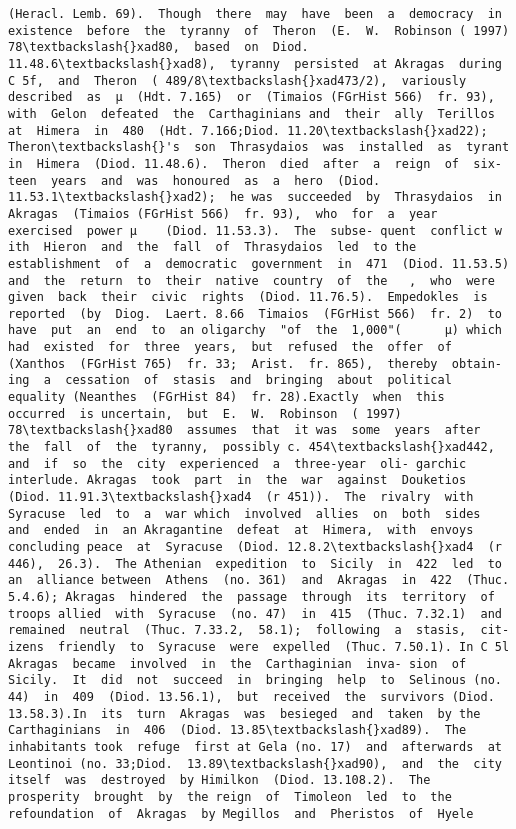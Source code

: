 \documentclass[11pt]{article}
\begin{document}
\begin{Verbatim}[commandchars=\\\{\}]
(Heracl. Lemb. 69).  Though  there  may  have  been  a  democracy  in existence  before  the  tyranny  of  Theron  (E.  W.  Robinson ( 1997)  78\textbackslash{}xad80,  based  on  Diod. 11.48.6\textbackslash{}xad8),  tyranny  persisted  at Akragas  during  C 5f,  and  Theron  ( 489/8\textbackslash{}xad473/2),  variously described  as  µ  (Hdt. 7.165)  or  (Timaios (FGrHist 566)  fr. 93),  with  Gelon  defeated  the  Carthaginians and  their  ally  Terillos  at  Himera  in  480  (Hdt. 7.166;Diod. 11.20\textbackslash{}xad22);  Theron\textbackslash{}'s  son  Thrasydaios  was  installed  as  tyrant in  Himera  (Diod. 11.48.6).  Theron  died  after  a  reign  of  six- teen  years  and  was  honoured  as  a  hero  (Diod. 11.53.1\textbackslash{}xad2);  he was  succeeded  by  Thrasydaios  in  Akragas  (Timaios (FGrHist 566)  fr. 93),  who  for  a  year  exercised  power µ    (Diod. 11.53.3).  The  subse- quent  conflict w ith  Hieron  and  the  fall  of  Thrasydaios  led  to the  establishment  of  a  democratic  government  in  471  (Diod. 11.53.5)  and  the  return  to  their  native  country  of  the   ,  who  were  given  back  their  civic  rights  (Diod. 11.76.5).  Empedokles  is  reported  (by  Diog.  Laert. 8.66  Timaios  (FGrHist 566)  fr. 2)  to  have  put  an  end  to  an oligarchy  "of  the  1,000"(      µ) which had  existed  for  three  years,  but  refused  the  offer  of  (Xanthos  (FGrHist 765)  fr. 33;  Arist.  fr. 865),  thereby  obtain- ing  a  cessation  of  stasis  and  bringing  about  political  equality (Neanthes  (FGrHist 84)  fr. 28).Exactly  when  this  occurred  is uncertain,  but  E.  W.  Robinson  ( 1997)  78\textbackslash{}xad80  assumes  that  it was  some  years  after  the  fall  of  the  tyranny,  possibly c. 454\textbackslash{}xad442,  and  if  so  the  city  experienced  a  three-year  oli- garchic  interlude. Akragas  took  part  in  the  war  against  Douketios  (Diod. 11.91.3\textbackslash{}xad4  (r 451)).  The  rivalry  with  Syracuse  led  to  a  war which  involved  allies  on  both  sides  and  ended  in  an Akragantine  defeat  at  Himera,  with  envoys  concluding peace  at  Syracuse  (Diod. 12.8.2\textbackslash{}xad4  (r 446),  26.3).  The Athenian  expedition  to  Sicily  in  422  led  to  an  alliance between  Athens  (no. 361)  and  Akragas  in  422  (Thuc. 5.4.6); Akragas  hindered  the  passage  through  its  territory  of  troops allied  with  Syracuse  (no. 47)  in  415  (Thuc. 7.32.1)  and remained  neutral  (Thuc. 7.33.2,  58.1);  following  a  stasis,  cit- izens  friendly  to  Syracuse  were  expelled  (Thuc. 7.50.1). In C 5l  Akragas  became  involved  in  the  Carthaginian  inva- sion  of  Sicily.  It  did  not  succeed  in  bringing  help  to  Selinous (no. 44)  in  409  (Diod. 13.56.1),  but  received  the  survivors (Diod. 13.58.3).In  its  turn  Akragas  was  besieged  and  taken  by the  Carthaginians  in  406  (Diod. 13.85\textbackslash{}xad89).  The  inhabitants took  refuge  first at Gela (no. 17)  and  afterwards  at  Leontinoi (no. 33;Diod.  13.89\textbackslash{}xad90),  and  the  city  itself  was  destroyed  by Himilkon  (Diod. 13.108.2).  The  prosperity  brought  by  the reign  of  Timoleon  led  to  the  refoundation  of  Akragas  by Megillos  and  Pheristos  of  Hyele  
\end{Verbatim}
\end{document}
